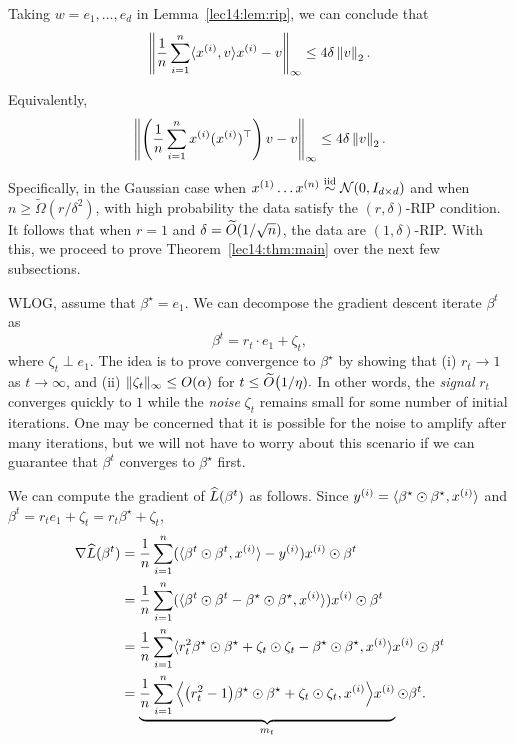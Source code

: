 \begin{corollary}\label{lec14:cor:rip}
    Taking $w = e_1, \dots, e_d$ in Lemma~\ref{lec14:lem:rip}, we can conclude that
    \begin{equation}
        \Norm{ \frac{1}{n} \sum_{i=1}^n \langle x^{(i)}, v\rangle x^{(i)} - v }_\infty \leq 4\delta \Norm{v}_2.
    \end{equation}
    
    Equivalently,
    \begin{equation}
        \Norm{ \l(\frac{1}{n} \sum_{i=1}^n x^{(i)}(x^{(i)})^\top \r)v - v }_\infty \leq 4\delta \Norm{v}_2.
    \end{equation}
\end{corollary}

Specifically, in the Gaussian case when $x^{(1)} \ldots x^{(n)} \iid \mathcal{N}(0, I_{d\times d})$ and when $n\geq \widetilde{\Omega}(r/\delta^2)$, with high probability the data satisfy the $(r, \delta)$-RIP condition. It follows that when $r=1$ and $\delta = \tilO(1/\sqrt{n})$, the data are $(1, \delta)$-RIP. With this, we proceed to prove Theorem~\ref{lec14:thm:main} over the next few subsections.


WLOG, assume that $\beta^\star = e_{1}.$ We can decompose the gradient descent iterate $\beta^{t}$ as
\begin{equation}
    \beta^{t} = r_{t} \cdot e_{1} + \zeta_{t},
\end{equation}
where $\zeta_t \perp e_1$. The idea is to prove convergence to $\beta^\star$ by showing that (i) $r_{t} \rightarrow 1$ as $t \rightarrow \infty$, and (ii) $\norm{\zeta_{t}}_{\infty} \leq O(\alpha)$ for $t \leq \tilO\big(1/\eta).$ In other words, the \textit{signal} $r_{t}$ converges quickly to $1$ while the \textit{noise} $\zeta_t$ remains small for some number of initial iterations. One may be concerned that it is possible for the noise to amplify after many iterations, but we will not have to worry about this scenario if we can guarantee that $\beta^{t}$ converges to $\beta^\star$ first.

We can compute the gradient of $\empLt$ as follows. Since $y\sp{i} = \langle \beta^\star \odot \beta^\star, x\sp{i} \rangle$ and $\beta^{t} = r_{t}e_{1} + \zeta_{t} = r_{t}\beta^\star + \zeta_{t}$,
\begin{align}
    \nabla \empLt &= \frac{1}{n} \sum_{i=1}^{n} (\langle \beta^{t} \odot \beta^{t}, x\sp{i} \rangle - y\sp{i} ) x\sp{i} \odot \beta^{t} \\
    &= \frac{1}{n} \sum_{i=1}^{n} ( \langle \beta^{t} \odot \beta^{t} - \beta^\star \odot \beta^\star, x\sp{i} \rangle ) x\sp{i} \odot \beta^{t} \\
    &= \frac{1}{n} \sum_{i=1}^{n} \langle r_{t}^{2} \beta^\star \odot \beta^\star + \zeta_{t} \odot \zeta_{t} - \beta^\star \odot \beta^\star, x\sp{i}  \rangle x\sp{i} \odot \beta^{t} \\
    &= \underbrace{\frac{1}{n} \sum_{i=1}^{n} \Big\langle \big(r_{t}^{2} - 1\big) \beta^\star \odot \beta^\star + \zeta_{t} \odot \zeta_{t}, x\sp{i}  \Big\rangle x\sp{i}}_{m_t} \odot \beta^{t}.
\end{align}

